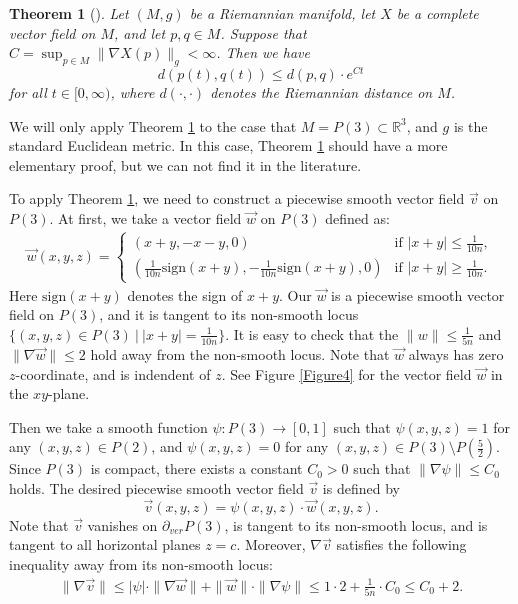 \documentclass{amsart}
\newtheorem{thm}{Theorem}[section]
\begin{document}
\begin{thm}[\cite{KSSV}]\label{Lipschitz}
Let $(M, g)$ be a Riemannian manifold, let $X$ be a complete vector field on $M$, and let $p,q\in M$. Suppose that $C=\sup_{p\in M}\|\nabla X(p)\|_g<\infty$. Then we have $$d(p(t),q(t))\leq d(p,q)\cdot e^{Ct}$$ for all $t\in [0,\infty)$, where $d(\cdot, \cdot)$ denotes the Riemannian distance on $M$.
\end{thm}

We will only apply Theorem \ref{Lipschitz} to the case that $M=P(3)\subset \mathbb{R}^3$, and $g$ is the standard Euclidean metric. In this case, Theorem \ref{Lipschitz} should have a more elementary proof, but we can not find it in the literature.

To apply Theorem \ref{Lipschitz}, we need to construct a piecewise smooth vector field $\vec{v}$ on $P(3)$. At first, we take a vector field $\vec{w}$ on $P(3)$ defined as:
\begin{equation}\label{vectorfield}
\begin{aligned}
\vec{w}(x,y,z)=
\begin{cases}
(x+y,-x-y,0)& \text{if\ } |x+y|\leq \frac{1}{10n},\\
(\frac{1}{10n}\text{sign}(x+y), -\frac{1}{10n}\text{sign}(x+y), 0) & \text{if\ }|x+y|\geq \frac{1}{10n}.
\end{cases}
\end{aligned}
\end{equation}
Here $\text{sign}(x+y)$ denotes the sign of $x+y$. Our $\vec{w}$ is a piecewise smooth vector field on $P(3)$, and it is tangent to its non-smooth locus $\{(x,y,z)\in P(3)\ |\ |x+y|=\frac{1}{10n}\}.$ It is easy to check that the $\|w\|\leq \frac{1}{5n}$ and $\|\nabla \vec{w}\|\leq 2$ hold away from the non-smooth locus. Note that $\vec{w}$ always has zero $z$-coordinate, and is indendent of $z$. See Figure \ref{Figure4} for the vector field $\vec{w}$ in the $xy$-plane.

Then we take a smooth function $\psi:P(3)\to [0,1]$ such that $\psi(x,y,z)=1$ for any $(x,y,z)\in P(2)$, and $\psi(x,y,z)=0$ for any $(x,y,z)\in P(3)\setminus P(\frac{5}{2})$. Since $P(3)$ is compact, there exists a constant $C_0>0$ such that $\|\nabla \psi\|\leq C_0$ holds.  The desired piecewise smooth vector field $\vec{v}$ is defined by 
$$\vec{v}(x,y,z)=\psi(x,y,z)\cdot \vec{w}(x,y,z).$$ 
Note that $\vec{v}$ vanishes on $\partial_{ver}P(3)$, is tangent to its non-smooth locus, and is tangent to all horizontal planes $z=c$. Moreover, $\nabla \vec{v}$ satisfies the following inequality away from its non-smooth locus:
\begin{equation}\label{6}
\begin{aligned}
\|\nabla \vec{v}\|\leq |\psi|\cdot \|\nabla \vec{w}\|+\|\vec{w}\|\cdot \|\nabla \psi \|\leq 1\cdot 2 +\frac{1}{5n}\cdot C_0\leq C_0+2.
\end{aligned}
\end{equation}
\end{document}
